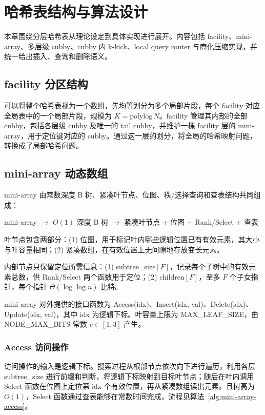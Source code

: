 \chapter{哈希表结构与算法设计}
\label{ch:system}

本章围绕分层哈希表从理论设定到具体实现进行展开。内容包括 facility、mini-array、多层级 cubby、cubby 内 k-kick、local query router 与商化压缩实现，并统一给出插入、查询和删除语义。

\section{facility 分区结构}

可以将整个哈希表视为一个数组，先均等划分为多个局部片段，每个 facility 对应全局表中的一个局部片段，规模为 \(K=\mathrm{polylog}\,N\)。facility 管理其内部的全部 cubby，包括各层级 cubby 及唯一的 tail cubby，并维护一棵 facility 层的 mini-array，用于定位键对应的 cubby。通过这一层的划分，将全局的哈希映射问题，转换成了局部哈希问题。

\section{mini-array 动态数组}

mini-array 由常数深度 B 树、紧凑叶节点、位图、秩/选择查询和查表结构共同组成：
\begin{center}
  \small
  mini-array $\rightarrow$ $O(1)$ 深度 B 树 $\rightarrow$ 紧凑叶节点 + 位图 + Rank/Select + 查表
\end{center}

叶节点包含两部分：(1) 位图，用于标记叶内哪些逻辑位置已有有效元素，其大小与叶容量相同；(2) 紧凑数组，在有效位置上无间隙地存放变长元素。

内部节点只保留定位所需信息：(1) subtree\_size$[F]$，记录每个子树中的有效元素总数，供 Rank/Select 两个函数用于定位；(2) children$[F]$，至多 \(F\) 个子女指针，每个指针 \(\Theta(\log\log n)\) 比特。

mini-array 对外提供的接口函数为 Access(idx)、Insert(idx, val)、Delete(idx)、Update(idx, val)，其中 idx 为逻辑下标。叶容量上限为 MAX\_LEAF\_SIZE，由 NODE\_MAX\_BITS 常数 \(c\in[1,3]\) 产生\cite{bender2022otsh,kurpicz2023pachash,lehmann2024shockhash}。

\subsection{Access 访问操作}

访问操作的输入是逻辑下标。搜索过程从根部节点依次向下进行遍历，利用各层 subtree\_size 进行前缀和判断，将逻辑下标映射到目标叶节点；随后在叶内调用 Select 函数在位图上定位第 idx 个有效位置，再从紧凑数组读出元素。且树高为 \(O(1)\)，Select 函数通过查表能够在常数时间完成\cite{jacobson1989,pagh2008retrieval,kurpicz2023pachash}，流程见算法~\ref{alg:mini-array-access}。


